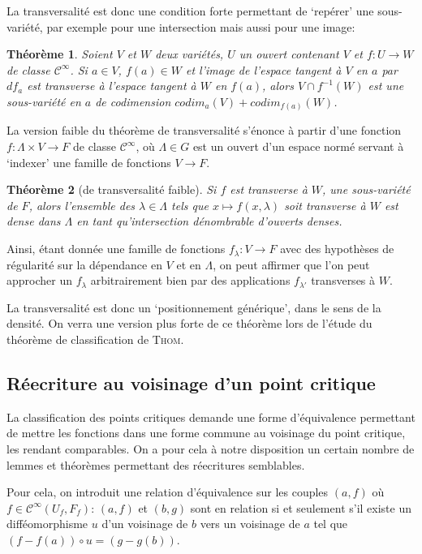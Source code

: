 \documentclass{article}
\newcommand{\cinf}{\mathcal{C}^\infty}
\newtheorem{thm}{Théorème}
\theoremstyle{definition}
\begin{document}
La transversalité est donc une condition forte permettant de `repérer' une sous-variété, par exemple pour une intersection mais aussi pour une image:
\begin{thm}
	Soient $V$ et $W$ deux variétés, $U$ un ouvert contenant $V$ et $f:U\to W$ de classe $\cinf$.
	Si $a\in V$, $f(a)\in W$ et l'image de l'espace tangent à $V$ en $a$ par $df_a$ est transverse à l'espace tangent à $W$ en $f(a)$, alors $V\cap f^{-1}(W)$ est une sous-variété en $a$ de codimension $codim_a(V) + codim_{f(a)}(W)$.
\end{thm}

La version faible du théorème de transversalité s'énonce à partir d'une fonction $f: \Lambda\times V\to F$ de classe $\cinf$, où $\Lambda\in G$ est un ouvert d'un espace normé servant à `indexer' une famille de fonctions $V\to F$.
\begin{thm}[de transversalité faible]
	Si $f$ est transverse à $W$, une sous-variété de $F$, alors l'ensemble des $\lambda\in\Lambda$ tels que $x\mapsto f(x,\lambda)$ soit transverse à $W$ est dense dans $\Lambda$ en tant qu'intersection dénombrable d'ouverts denses.
\end{thm}

Ainsi, étant donnée une famille de fonctions $f_\lambda: V\to F$ avec des hypothèses de régularité sur la dépendance en $V$ et en $\Lambda$, on peut affirmer que l'on peut approcher un $f_\lambda$ arbitrairement bien par des applications $f_{\lambda'}$ transverses à $W$.

La transversalité est donc un `positionnement générique', dans le sens de la densité. On verra une version plus forte de ce théorème lors de l'étude du théorème de classification de \textsc{Thom}.

\subsection{Réecriture au voisinage d'un point critique}

La classification des points critiques demande une forme d'équivalence permettant de mettre les fonctions dans une forme commune au voisinage du point critique, les rendant comparables.
On a pour cela à notre disposition un certain nombre de lemmes et théorèmes permettant des réecritures semblables.

Pour cela, on introduit une relation d'équivalence sur les couples $(a,f)$ où $f\in\cinf(U_f,F_f)$: $(a,f)$ et $(b,g)$ sont en relation si et seulement s'il existe un difféomorphisme $u$ d'un voisinage de $b$ vers un voisinage de $a$ tel que $(f-f(a))\circ u = (g-g(b))$.
\end{document}
